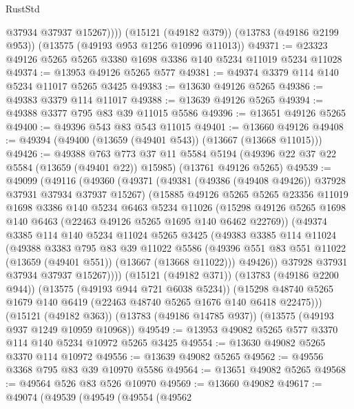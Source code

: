 \begin{lexlean}{RustStd}
\begin{coremodule}
            @37934
            @37937
            @15267))))
    (@15121 (@49182 @379))
    (@13783 (@49186 @2199 @953))
    (@13575 (@49193 @953 @1256 @10996 @11013))
@49371 := @23323 @49126 @5265 @5265 @3380 @1698 @3386 @140 @5234 @11019 @5234 @11028
@49374 := @13953 @49126 @5265 @577
@49381 := @49374 @3379 @114 @140 @5234 @11017 @5265 @3425
@49383 := @13630 @49126 @5265
@49386 := @49383 @3379 @114 @11017
@49388 := @13639 @49126 @5265
@49394 := @49388 @3377 @795 @83 @39 @11015 @5586
@49396 := @13651 @49126 @5265
@49400 := @49396 @543 @83 @543 @11015
@49401 := @13660 @49126
@49408 := @49394 (@49400 (@13659 (@49401 @543)) (@13667 (@13668 @11015)))
@49426 := @49388
    @763
    @773
    @37
    @11
    @5584
    @5194
    (@49396 @22 @37 @22 @5584 (@13659 (@49401 @22)) @15985)
    (@13761 @49126 @5265)
@49539 := @49099
    (@49116
      (@49360
        (@49371
          (@49381 (@49386 (@49408 @49426)) @37928 @37931 @37934 @37937 @15267)
          (@15885
            @49126
            @5265
            @5265
            @23356
            @11019
            @1698
            @3386
            @140
            @5234
            @6463
            @5234
            @11026
            (@15298 @49126 @5265 @1698 @140 @6463 (@22463 @49126 @5265 @1695 @140 @6462 @22769))
            (@49374
              @3385
              @114
              @140
              @5234
              @11024
              @5265
              @3425
              (@49383
                @3385
                @114
                @11024
                (@49388
                  @3383
                  @795
                  @83
                  @39
                  @11022
                  @5586
                  (@49396 @551 @83 @551 @11022 (@13659 (@49401 @551)) (@13667 (@13668 @11022)))
                  @49426))
              @37928
              @37931
              @37934
              @37937
              @15267))))
      (@15121 (@49182 @371))
      (@13783 (@49186 @2200 @944))
      (@13575 (@49193 @944 @721 @6038 @5234))
      (@15298 @48740 @5265 @1679 @140 @6419 (@22463 @48740 @5265 @1676 @140 @6418 @22475)))
    (@15121 (@49182 @363))
    (@13783 (@49186 @14785 @937))
    (@13575 (@49193 @937 @1249 @10959 @10968))
@49549 := @13953 @49082 @5265 @577 @3370 @114 @140 @5234 @10972 @5265 @3425
@49554 := @13630 @49082 @5265 @3370 @114 @10972
@49556 := @13639 @49082 @5265
@49562 := @49556 @3368 @795 @83 @39 @10970 @5586
@49564 := @13651 @49082 @5265
@49568 := @49564 @526 @83 @526 @10970
@49569 := @13660 @49082
@49617 := @49074
    (@49539
      (@49549
        (@49554
          (@49562

\end{coremodule}
\end{lexlean}
